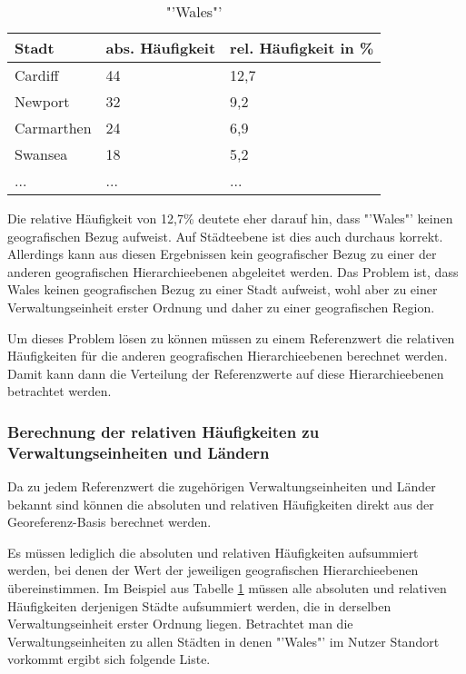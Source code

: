 			\begin{table}[h]
			\centering
			\caption{"'Wales"'}
			\label{tab:walesCity}
			\begin{tabular}{|l|l|l|}
			\hline
			Stadt      & abs. Häufigkeit & rel. Häufigkeit in \% \\ \hline \hline
			Cardiff    & 44 			 & 12,7 \\ \hline
			Newport    & 32 			 & 9,2  \\ \hline
			Carmarthen & 24 			 & 6,9  \\ \hline
			Swansea    & 18 			 & 5,2  \\ \hline
			...    & ... & ...  \\ \hline
			\end{tabular}
			\end{table}

			Die relative Häufigkeit von 12,7\% deutete eher darauf hin, dass "'Wales"' keinen geografischen Bezug aufweist.
			Auf Städteebene ist dies auch durchaus korrekt. 
			Allerdings kann aus diesen Ergebnissen kein geografischer Bezug zu einer der anderen geografischen Hierarchieebenen abgeleitet werden.
			Das Problem ist, dass Wales keinen geografischen Bezug zu einer Stadt aufweist, wohl aber zu einer Verwaltungseinheit erster Ordnung und daher zu einer geografischen Region. 

			Um dieses Problem lösen zu können müssen zu einem Referenzwert die relativen Häufigkeiten für die anderen geografischen Hierarchieebenen berechnet werden.
			Damit kann dann die Verteilung der Referenzwerte auf diese Hierarchieebenen betrachtet werden.
			
		\subsubsection{Berechnung der relativen Häufigkeiten zu Verwaltungseinheiten und Ländern} 

			Da zu jedem Referenzwert die zugehörigen Verwaltungseinheiten und Länder bekannt sind können die absoluten und relativen Häufigkeiten direkt aus der Georeferenz-Basis berechnet werden.

			Es müssen lediglich die absoluten und relativen Häufigkeiten aufsummiert werden, bei denen der Wert der jeweiligen geografischen Hierarchieebenen übereinstimmen.
			Im Beispiel aus Tabelle \ref{tab:walesCity} müssen alle absoluten und relativen Häufigkeiten derjenigen Städte aufsummiert werden, die in derselben Verwaltungseinheit erster Ordnung liegen.
			Betrachtet man die Verwaltungseinheiten zu allen Städten in denen "'Wales"' im Nutzer Standort vorkommt ergibt sich folgende Liste.

